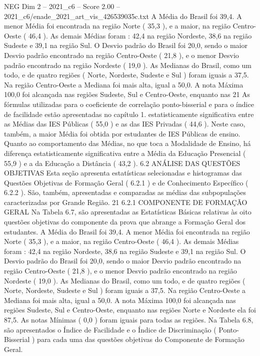 \begin{textsample}{NEG Dim 2 – 2021\_c6 – Score 2.00 – 2021\_c6/enade\_2021\_art\_vis\_426539035c.txt}
A Média do Brasil foi 39,4.
A menor Média foi encontrada na região Norte ( 35,3 ), e a maior, na região Centro-Oeste ( 46,4 ).
As demais Médias foram : 42,4 na região Nordeste, 38,6 na região Sudeste e 39,1 na região Sul.
O Desvio padrão do Brasil foi 20,0, sendo o maior Desvio padrão encontrado na região Centro-Oeste ( 21,8 ), e o menor Desvio padrão encontrado na região Nordeste ( 19,0 ).
As Medianas do Brasil, como um todo, e de quatro regiões ( Norte, Nordeste, Sudeste e Sul ) foram iguais a 37,5.
Na região Centro-Oeste a Mediana foi mais alta, igual a 50,0.
A nota Máxima 100,0 foi alcançada nas regiões Sudeste, Sul e Centro-Oeste, enquanto nas 21 As fórmulas utilizadas para o coeficiente de correlação ponto-bisserial e para o índice de facilidade estão apresentadas no capítulo 1. estatisticamente significativa entre as Médias das IES Públicas ( 55,0 ) e as das IES Privadas ( 44,6 ).
Neste caso, também, a maior Média foi obtida por estudantes de IES Públicas de ensino.
Quanto ao comportamento das Médias, no que toca a Modalidade de Ensino, há diferença estatisticamente significativa entre a Média da Educação Presencial ( 55,9 ) e a da Educação a Distância ( 43,2 ). 6.2 ANÁLISE DAS QUESTÕES OBJETIVAS Esta seção apresenta estatísticas selecionadas e histogramas das Questões Objetivas de Formação Geral ( 6.2.1 ) e de Conhecimento Específico ( 6.2.2 ).
São, também, apresentadas e comparadas as médias das subpopulações caracterizadas por Grande Região. 21 6.2.1 COMPONENTE DE FORMAÇÃO GERAL Na Tabela 6.7, são apresentadas as Estatísticas Básicas relativas às oito questões objetivas do componente da prova que abrange a Formação Geral dos estudantes.
A Média do Brasil foi 39,4.
A menor Média foi encontrada na região Norte ( 35,3 ), e a maior, na região Centro-Oeste ( 46,4 ).
As demais Médias foram : 42,4 na região Nordeste, 38,6 na região Sudeste e 39,1 na região Sul.
O Desvio padrão do Brasil foi 20,0, sendo o maior Desvio padrão encontrado na região Centro-Oeste ( 21,8 ), e o menor Desvio padrão encontrado na região Nordeste ( 19,0 ).
As Medianas do Brasil, como um todo, e de quatro regiões ( Norte, Nordeste, Sudeste e Sul ) foram iguais a 37,5.
Na região Centro-Oeste a Mediana foi mais alta, igual a 50,0.
A nota Máxima 100,0 foi alcançada nas regiões Sudeste, Sul e Centro-Oeste, enquanto nas regiões Norte e Nordeste ela foi 87,5.
As notas Mínimas ( 0,0 ) foram iguais para todas as regiões.
Na Tabela 6.8, são apresentados o Índice de Facilidade e o Índice de Discriminação ( Ponto-Bisserial ) para cada uma das questões objetivas do Componente de Formação Geral.

\end{textsample}
